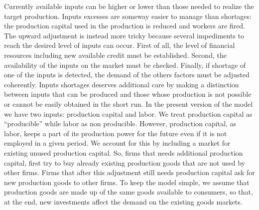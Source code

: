 \documentclass{book}
\begin{document}
Currently available inputs can be higher or lower than those needed to realize the target production. Inputs excesses are someway easier to manage than shortages: the production capital used in the production is reduced and workers are fired.
The upward adjustment is instead more tricky because 
several impediments to reach the desired level of inputs can occur.
First of all, the level of financial resources including new available credit must be established. Second, the availability of the inputs on the market must be checked. Finally, if shortage of one of the inputs is detected, the demand of the others factors must be adjusted coherently. Inputs shortages deserves additional care by making a distinction between inputs that can be produced and those whose production is not possible or cannot be easily obtained in the short run. In the present version of the model we have two inputs: production capital and labor. We treat production capital as ``producible'' while labor as non producible.  
However, production capital, as labor, keeps a part of its production power for the future even if it is not employed in a given period. We account for this by including a market for existing unused production capital. So, firms that needs additional production capital, first try to buy already existing production goods that are not used by other firms. Firms that after this adjustment still needs production capital ask for new production goods to other firms. To keep the model simple, we assume that production goods are made up of the same goods available to consumers, so that, at the end, new investments affect the demand on the existing goods markets.


\end{document}
